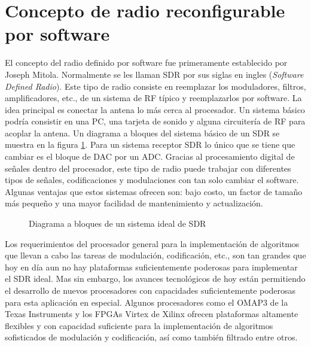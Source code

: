 \section{Concepto de radio reconfigurable por software}

El concepto del radio definido por software fue primeramente establecido por
Joseph Mitola\citeyear{mitola}. Normalmente se les llaman SDR por sus siglas en
ingles (\emph{Software Defined Radio}). Este tipo de radio consiste en
reemplazar los moduladores, filtros, amplificadores, etc., de un sistema de RF
t\'ipico y reemplazarlos por software. La idea principal es conectar la antena
lo m\'as cerca al procesador. Un sistema b\'asico podr\'ia consistir en una PC,
una tarjeta de sonido y alguna circuiter\'ia de RF para acoplar la antena.
Un diagrama a bloques del sistema b\'asico de un SDR se muestra en la figura
\ref{fig:sdr}. Para un sistema receptor SDR lo \'unico que se tiene que cambiar
es el bloque de DAC por un ADC. Gracias al procesamiento digital de se\~nales dentro del
procesador, este tipo de radio puede trabajar con diferentes tipos de se\~nales,
codificaciones y modulaciones con tan solo cambiar el software. Algunas ventajas
que estos sistemas ofrecen son: bajo costo, un factor de tama\~no m\'as peque\~no
y una mayor facilidad de mantenimiento y actualizaci\'on.

\begin{figure}[tp]
\centering
	\vspace{0.3in}
	\caption{Diagrama a bloques de un sistema ideal de SDR}
	\label{fig:sdr}
\end{figure}

Los requerimientos del procesador general para la implementaci\'on de algoritmos
que llevan a cabo las tareas de modulaci\'on, codificaci\'on, etc., son tan
grandes que hoy en d\'ia aun no hay plataformas suficientemente poderosas para
implementar el SDR ideal. Mas sin embargo, los avances tecnol\'ogicos de hoy
est\'an permitiendo el desarrollo de nuevos procesadores con capacidades
suficientemente poderosas para esta aplicaci\'on en especial. Algunos
procesadores como el OMAP3 de la Texas Instruments \cite{ti} y los FPGAs Virtex
de Xilinx \cite{lyrtech} ofrecen plataformas altamente flexibles
y con capacidad suficiente para la implementaci\'on de algoritmos sofisticados
de modulaci\'on y codificaci\'on, as\'i como tambi\'en filtrado entre otros.

